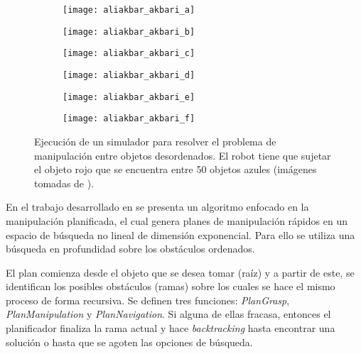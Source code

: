 \begin{figure}[H]
	\begin{subfigure}{0.3\textwidth}
		\texttt{[image: aliakbar\_akbari\_a]}%
		\subcaption{}%
	\end{subfigure}%
	\hspace{0.25cm}%
	\begin{subfigure}{0.3\textwidth}
		\texttt{[image: aliakbar\_akbari\_b]}%
		\subcaption{}%
	\end{subfigure}%
	\hspace{0.25cm}%
	\begin{subfigure}{0.3\textwidth}
		\texttt{[image: aliakbar\_akbari\_c]}%
		\subcaption{}%
		\label{subfig:Akbari2019c}%
	\end{subfigure}%
	
	\vspace{3pt}%
	\begin{subfigure}{0.3\textwidth}
		\texttt{[image: aliakbar\_akbari\_d]}%
		\subcaption{}%
	\end{subfigure}%
	\hspace{0.25cm}%
	\begin{subfigure}{0.3\textwidth}
		\texttt{[image: aliakbar\_akbari\_e]}%
		\subcaption{}%
		\label{subfig:Akbari2019e}%
	\end{subfigure}%
	\hspace{0.25cm}%
	\begin{subfigure}{0.3\textwidth}
		\texttt{[image: aliakbar\_akbari\_f]}%
		\subcaption{}%
	\end{subfigure}%
	\caption{Ejecución de un simulador para resolver el problema de manipulación entre objetos desordenados. El robot tiene que sujetar el objeto rojo que se encuentra entre 50 objetos azules (imágenes tomadas de \cite{Akbari2019}).}%
	\label{fig:Akbari2019}%
\end{figure}
%
En el trabajo desarrollado en \cite{4209604} se presenta un algoritmo enfocado en la manipulación planificada, el cual genera planes de manipulación rápidos en un espacio de búsqueda no lineal de dimensión exponencial.
Para ello se utiliza una búsqueda en profundidad sobre los obstáculos ordenados.

El plan comienza desde el objeto que se desea tomar (raíz) y a partir de este, se identifican los posibles obstáculos (ramas) sobre los cuales se hace el mismo proceso de forma recursiva.
Se definen tres funciones: \textit{PlanGrasp}, \textit{PlanManipulation} y \textit{PlanNavigation}.
Si alguna de ellas fracasa, entonces el planificador finaliza la rama actual y hace \textit{backtracking} hasta encontrar una solución o hasta que se agoten las opciones de búsqueda.

